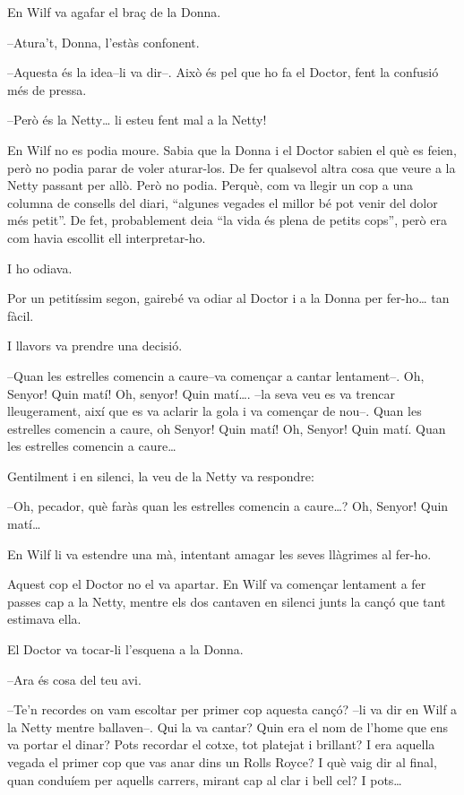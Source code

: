 En Wilf va agafar el braç de la Donna.

--Atura't, Donna, l'estàs confonent.

--Aquesta és la idea--li va dir--. Això és pel que ho fa el Doctor, fent
la confusió més de pressa.

--Però és la Netty\ldots{} li esteu fent mal a la Netty!

En Wilf no es podia moure. Sabia que la Donna i el Doctor sabien el què
es feien, però no podia parar de voler aturar-los. De fer qualsevol
altra cosa que veure a la Netty passant per allò. Però no podia. Perquè,
com va llegir un cop a una columna de consells del diari, ``algunes
vegades el millor bé pot venir del dolor més petit''. De fet,
probablement deia ``la vida és plena de petits cops'', però era com
havia escollit ell interpretar-ho.

I ho odiava.

Por un petitíssim segon, gairebé va odiar al Doctor i a la Donna per
fer-ho\ldots{} tan fàcil.

I llavors va prendre una decisió.

--Quan les estrelles comencin a caure--va començar a cantar lentament--.
Oh, Senyor! Quin matí! Oh, senyor! Quin matí\ldots{}. --la seva veu es
va trencar lleugerament, així que es va aclarir la gola i va començar de
nou--. Quan les estrelles comencin a caure, oh Senyor! Quin matí! Oh,
Senyor! Quin matí. Quan les estrelles comencin a caure\ldots{}

Gentilment i en silenci, la veu de la Netty va respondre:

--Oh, pecador, què faràs quan les estrelles comencin a caure\ldots{}?
Oh, Senyor! Quin matí\ldots{}

En Wilf li va estendre una mà, intentant amagar les seves llàgrimes al
fer-ho.

Aquest cop el Doctor no el va apartar. En Wilf va començar lentament a
fer passes cap a la Netty, mentre els dos cantaven en silenci junts la
cançó que tant estimava ella.

El Doctor va tocar-li l'esquena a la Donna.

--Ara és cosa del teu avi.

--Te'n recordes on vam escoltar per primer cop aquesta cançó? --li va
dir en Wilf a la Netty mentre ballaven--. Qui la va cantar? Quin era el
nom de l'home que ens va portar el dinar? Pots recordar el cotxe, tot
platejat i brillant? I era aquella vegada el primer cop que vas anar
dins un Rolls Royce? I què vaig dir al final, quan conduíem per aquells
carrers, mirant cap al clar i bell cel? I pots\ldots{}

